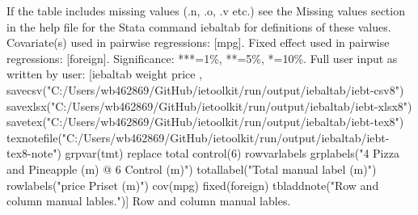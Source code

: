 If the table includes missing values (.n, .o, .v etc.) see the Missing values section in the help file for the Stata command iebaltab for definitions of these values. Covariate(s) used in pairwise regressions: [mpg]. Fixed effect used in pairwise regressions: [foreign]. Significance: ***=1\%, **=5\%, *=10\%. Full user input as written by user: [iebaltab weight price , savecsv("C:/Users/wb462869/GitHub/ietoolkit/run/output/iebaltab/iebt-csv8") savexlsx("C:/Users/wb462869/GitHub/ietoolkit/run/output/iebaltab/iebt-xlsx8") savetex("C:/Users/wb462869/GitHub/ietoolkit/run/output/iebaltab/iebt-tex8") texnotefile("C:/Users/wb462869/GitHub/ietoolkit/run/output/iebaltab/iebt-tex8-note") grpvar(tmt) replace total control(6) rowvarlabels grplabels("4 Pizza and Pineapple (m) @ 6 Control (m)") totallabel("Total manual label (m)") rowlabels("price Priset (m)") cov(mpg) fixed(foreign) tbladdnote("Row and column manual lables.")] Row and column manual lables.
